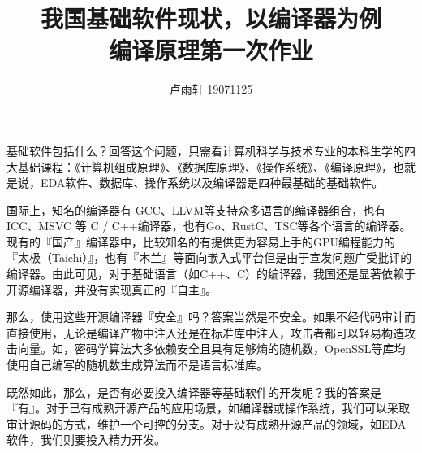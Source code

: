 \documentclass{ctexart}
\title{我国基础软件现状，以编译器为例 \\
\large 编译原理第一次作业}
\author{卢雨轩 19071125}
\begin{document}
\maketitle

基础软件包括什么？回答这个问题，只需看计算机科学与技术专业的本科生学的四大基础课程：《计算机组成原理》、《数据库原理》、《操作系统》、《编译原理》，也就是说，EDA软件、数据库、操作系统以及编译器是四种最基础的基础软件。

国际上，知名的编译器有 GCC、LLVM等支持众多语言的编译器组合，也有ICC、MSVC 等 C / C++编译器，也有Go、RustC、TSC等各个语言的编译器。现有的『国产』编译器中，比较知名的有提供更为容易上手的GPU编程能力的『太极（Taichi）』\cite{Hu_2020}，也有『木兰』等面向嵌入式平台但是由于宣发问题广受批评的编译器。由此可见，对于基础语言（如C++、C）的编译器，我国还是显著依赖于开源编译器，并没有实现真正的『自主』。

那么，使用这些开源编译器『安全』吗？答案当然是不安全。如果不经代码审计而直接使用，无论是编译产物中注入还是在标准库中注入，攻击者都可以轻易构造攻击向量。如，密码学算法大多依赖安全且具有足够熵的随机数，OpenSSL等库均使用自己编写的随机数生成算法而不是语言标准库。

既然如此，那么，是否有必要投入编译器等基础软件的开发呢？我的答案是『有』。对于已有成熟开源产品的应用场景，如编译器或操作系统，我们可以采取审计源码的方式，维护一个可控的分支。对于没有成熟开源产品的领域，如EDA软件，我们则要投入精力开发。


\end{document}
